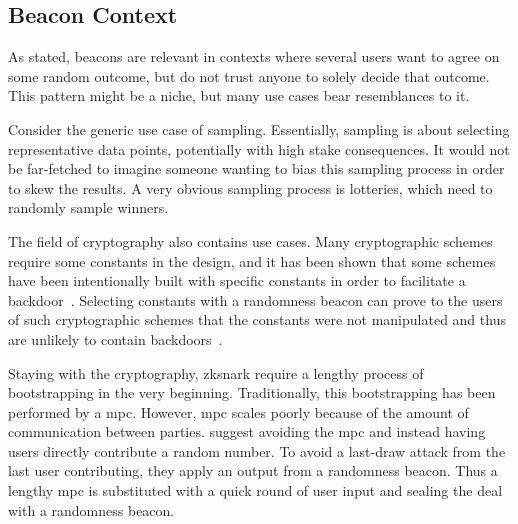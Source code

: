 \subsection{Beacon Context}
As stated, beacons are relevant in contexts where several users want to agree on some random outcome, but do not trust anyone to solely decide that outcome.
This pattern might be a niche, but many use cases bear resemblances to it.

Consider the generic use case of sampling. Essentially, sampling is about selecting representative data points, potentially with high stake consequences. It would not be far-fetched to imagine someone wanting to bias this sampling process in order to skew the results. A very obvious sampling process is lotteries, which need to randomly sample winners.

The field of cryptography also contains use cases.
Many cryptographic schemes require some constants in the design, and it has been shown that some schemes have been intentionally built with specific constants in order to facilitate a backdoor~\cite{nist2014backdoor}.
Selecting constants with a randomness beacon can prove to the users of such cryptographic schemes that the constants were not manipulated and thus are unlikely to contain backdoors~\cite{baigneres2015trap}.

Staying with the cryptography, \gls{zksnark} require a lengthy process of bootstrapping in the very beginning. Traditionally, this bootstrapping has been performed by a \gls{mpc}. However, \gls{mpc} scales poorly because of the amount of communication between parties. \citet{mpcsnarks} suggest avoiding the \gls{mpc} and instead having users directly contribute a random number. To avoid a last-draw attack from the last user contributing, they apply an output from a randomness beacon. Thus a lengthy \gls{mpc} is substituted with a quick round of user input and sealing the deal with a randomness beacon.

